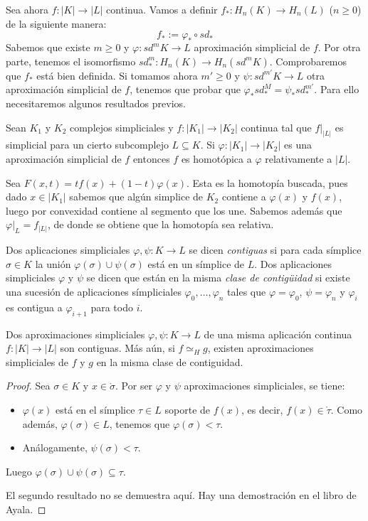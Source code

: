 \documentclass[HS.tex]{subfiles}
\begin{document}
Sea ahora $f:|K|\to|L|$ continua. Vamos a definir $f_*:H_n(K)\to H_n(L)$ ($n\geq 0$) de la siguiente manera:
\[
f_*:=\varphi_*\circ sd_*
\]
Sabemos que existe $m\geq 0$ y $\varphi:sd^mK\to L$ aproximación simplicial de $f$. Por otra parte, tenemos el isomorfismo $sd_*^m:H_n(K)\to H_n(sd^mK)$. Comprobaremos que $f_*$ está bien definida. Si tomamos ahora $m'\geq 0$ y $\psi:sd^{m'}K\to L$ otra aproximación simplicial de $f$, tenemos que probar que $\varphi_*sd_*^M=\psi_*sd_*^{m'}$. Para ello necesitaremos algunos resultados previos.

\begin{prop}
Sean $K_1$ y $K_2$ complejos simpliciales y $f:|K_1|\to|K_2|$ continua tal que $f|_{|L|}$ es simplicial para un cierto subcomplejo $L\subseteq K$. Si $\varphi:|K_1|\to|K_2|$ es una aproximación simplicial de $f$ entonces $f$ es homotópica a $\varphi$ relativamente a $|L|$.  
\end{prop}
\begin{dem}
Sea $F(x,t)=tf(x)+(1-t)\varphi(x)$. Esta es la homotopía buscada, pues dado $x\in|K_1|$ sabemos que algún simplice de $K_2$ contiene a $\varphi(x)$ y $f(x)$, luego por convexidad contiene al segmento que los une. Sabemos además que $\varphi|_{L}=f_{|L|}$, de donde se obtiene que la homotopía sea relativa.
\QED
\end{dem}

\begin{defi}
Dos aplicaciones simpliciales $\varphi,\psi:K\to L$ se dicen \emph{contiguas} si para cada símplice $\sigma\in K$ la unión $\varphi(\sigma)\cup\psi(\sigma)$ está en un símplice de $L$. Dos aplicaciones simpliciales $\varphi$ y $\psi$ se dicen que están en la misma \emph{clase de contigüidad} si existe una sucesión de aplicaciones símpliciales $\varphi_0,\dots, \varphi_n$ tales que $\varphi=\varphi_0$, $\psi=\varphi_n$ y $\varphi_i$ es contigua a $\varphi_{i+1}$ para todo $i$. 
\end{defi}

\begin{lemma}
Dos aproximaciones simpliciales $\varphi,\psi:K\to L$ de una misma aplicación continua $f:|K|\to|L|$ son contiguas. Más aún, si $f\simeq_H g$, existen aproximaciones simpliciales de $f$ y $g$ en la misma clase de contiguidad.
\end{lemma}
\begin{proof}
Sea $\sigma \in K$ y $x \in \mathring{\sigma}$.
Por ser $\varphi$ y $\psi$ aproximaciones simpliciales, se tiene:
\begin{itemize}
	\item $\varphi(x)$ está en el símplice $\tau \in L$ soporte de $f(x)$, es decir, $f(x) \in \mathring{\tau}$.
	Como además, $\varphi(\sigma) \in L$, tenemos que $\varphi(\sigma) < \tau$.
	\item Análogamente, $\psi(\sigma) < \tau$.
\end{itemize}
Luego $\varphi(\sigma) \cup \psi(\sigma) \subseteq \tau$.

El segundo resultado no se demuestra aquí.
Hay una demostración en el libro de Ayala.
\end{proof}
\end{document}
